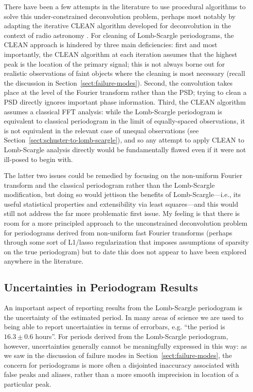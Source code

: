 \documentclass[preprint]{aastex}
\newcommand{\Sect}[1]{Section~\ref{sect:#1}}
\newcommand{\sect}[1]{\Sect{#1}}
\newcommand{\sectlabel}[1]{\label{sect:#1}}
\begin{document}
There have been a few attempts in the literature to use procedural algorithms
to solve this under-constrained deconvolution problem, perhaps most notably
by adapting the iterative CLEAN algorithm developed for deconvolution in the
context of radio astronomy \citep{Roberts87}.
For cleaning of Lomb-Scargle periodograms, the CLEAN approach is hindered by
three main deficiencies: first and most importantly, the CLEAN algorithm at each
iteration assumes that the highest peak is the location of the primary signal;
this is not always borne out for realistic observations of faint objects where
the cleaning is most necessary (recall the discussion in \sect{failure-modes}).
Second, the convolution takes place at the level of the Fourier transform
rather than the PSD; trying to clean a PSD directly ignores important phase
information. Third, the CLEAN algorithm assumes a classical FFT analysis:
while the Lomb-Scargle periodogram is equivalent to classical periodogram in the limit of
equally-spaced observations, it is not equivalent in the relevant case of
unequal observations (see \sect{schuster-to-lomb-scargle}),
and so any attempt to apply CLEAN to Lomb-Scargle analysis directly would
be fundamentally flawed even if it were not ill-posed to begin with.

The latter two issues could be remedied by focusing on the non-uniform
Fourier transform and the classical periodogram rather than the Lomb-Scargle
modification, but doing so would jettison the benefits of Lomb-Scargle---i.e.,
its useful statistical properties and extensibility via least squares---and
this would still not address the far more problematic first issue.
My feeling is that there is room for a more principled approach to the
unconstrained deconvolution problem for periodograms derived from non-uniform
fast Fourier transforms (perhaps through some sort of L1/lasso regularization
that imposes assumptions of sparsity on the true periodogram) but to date this
does not appear to have been explored anywhere in the literature.


\subsection{Uncertainties in Periodogram Results}
\sectlabel{uncertainties}
An important aspect of reporting results from the Lomb-Scargle periodogram is
the uncertainty of the estimated period.
In many areas of science we are used to being able to report uncertainties in
terms of errorbars, {e.g.} ``the period is $16.3 \pm 0.6$ hours''.
For periods derived from the Lomb-Scargle periodogram, however, uncertainties
generally cannot be meaningfully expressed in this way:
as we saw in the discussion of failure modes in \sect{failure-modes},
the concern for periodograms is more often a disjointed inaccuracy associated
with false peaks and aliases, rather than a more smooth imprecision in
location of a particular peak.
\end{document}
